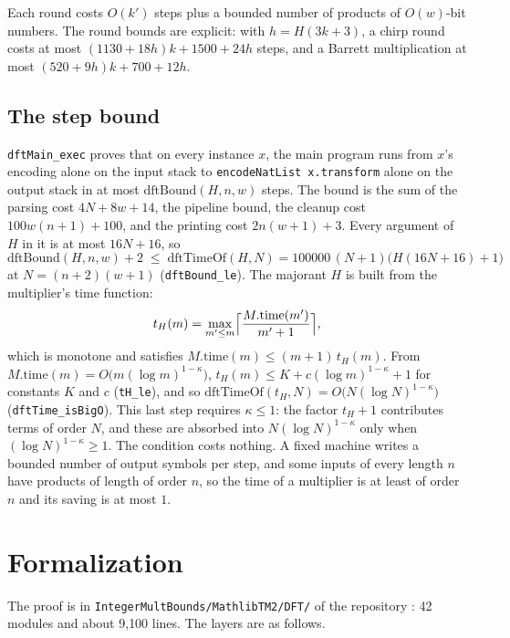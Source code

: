 \documentclass[11pt]{amsart}
\newcommand{\lean}[1]{\texttt{#1}}
\begin{document}
Each round costs $O(k')$ steps plus a bounded number of products of $O(w)$-bit numbers. The
round bounds are explicit: with $h = H(3k+3)$, a chirp round costs at most
$(1130 + 18h)k + 1500 + 24h$ steps, and a Barrett multiplication at most
$(520 + 9h)k + 700 + 12h$.

\subsection{The step bound}
\lean{dftMain\_exec} proves that on every instance $x$, the main program runs from $x$'s
encoding alone on the input stack to \lean{encodeNatList x.transform} alone on the output stack
in at most $\mathrm{dftBound}(H, n, w)$ steps. The bound is the sum of the parsing cost
$4N + 8w + 14$, the pipeline bound, the cleanup cost $100w(n+1) + 100$, and the printing cost
$2n(w+1) + 3$. Every argument of $H$ in it is at most $16N + 16$, so
\[
  \mathrm{dftBound}(H, n, w) + 2 \;\le\; \mathrm{dftTimeOf}(H, N)
  = 100000\,(N+1)\bigl(H(16N + 16) + 1\bigr)
\]
at $N = (n+2)(w+1)$ (\lean{dftBound\_le}). The majorant $H$ is built from the multiplier's
time function:
\[
  t_H(m) = \max_{m' \le m} \Bigl\lceil \frac{M.\mathrm{time}(m')}{m'+1} \Bigr\rceil ,
\]
which is monotone and satisfies $M.\mathrm{time}(m) \le (m+1)\, t_H(m)$. From
$M.\mathrm{time}(m) = O\bigl(m(\log m)^{1-\kappa}\bigr)$, $t_H(m) \le K + c (\log m)^{1-\kappa} + 1$
for constants $K$ and $c$ (\lean{tH\_le}), and so
$\mathrm{dftTimeOf}(t_H, N) = O\bigl(N(\log N)^{1-\kappa}\bigr)$ (\lean{dftTime\_isBigO}).
This last step requires $\kappa \le 1$: the factor $t_H + 1$ contributes terms of order $N$,
and these are absorbed into $N(\log N)^{1-\kappa}$ only when $(\log N)^{1-\kappa} \ge 1$. The
condition costs nothing. A fixed machine writes a bounded number of output symbols per step, and
some inputs of every length $n$ have products of length of order $n$, so the time of a
multiplier is at least of order $n$ and its saving is at most $1$.

\section{Formalization}
\label{sec:formal}

The proof is in \lean{IntegerMultBounds/MathlibTM2/DFT/} of the repository \cite{IMB}: 42
modules and about 9{,}100 lines. The layers are as follows.
\end{document}
